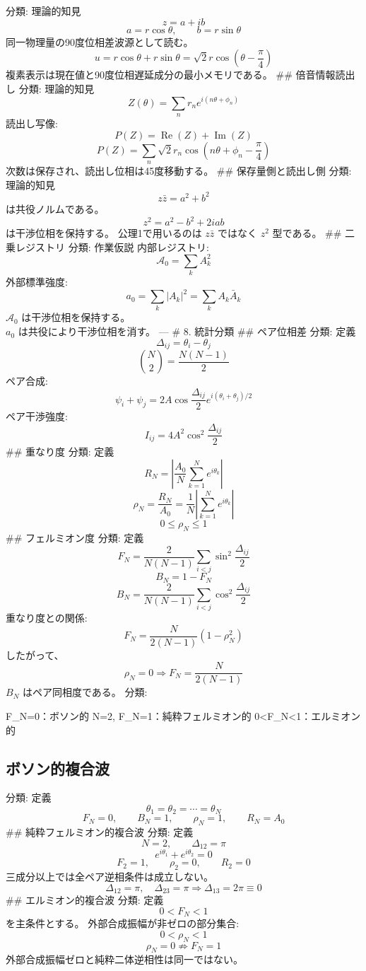 \documentclass[
  a4paper]{ltjsarticle}
\newenvironment{Shaded}{}{}
\newcommand{\NormalTok}[1]{#1}
\begin{document}
分類: 理論的知見 \[
z=a+ib
\] \[
a=r\cos\theta,\qquad b=r\sin\theta
\] 同一物理量の90度位相差波源として読む。 \[
u=r\cos\theta+r\sin\theta
=\sqrt2 r\cos\left(\theta-\frac{\pi}{4}\right)
\] 複素表示は現在値と90度位相遅延成分の最小メモリである。 \#\#
倍音情報読出し 分類: 理論的知見 \[
Z(\theta)=\sum_n r_n e^{i(n\theta+\phi_n)}
\] 読出し写像: \[
P(Z)=\operatorname{Re}(Z)+\operatorname{Im}(Z)
\] \[
P(Z)=\sum_n \sqrt2 r_n
\cos\left(n\theta+\phi_n-\frac{\pi}{4}\right)
\] 次数は保存され、読出し位相は45度移動する。 \#\# 保存量側と読出し側
分類: 理論的知見 \[
z\bar z=a^2+b^2
\] は共役ノルムである。 \[
z^2=a^2-b^2+2iab
\] は干渉位相を保持する。 公理1で用いるのは \(z\bar z\) ではなく \(z^2\)
型である。 \#\# 二乗レジストリ 分類: 作業仮説 内部レジストリ: \[
\mathcal{A}_0=\sum_k A_k^2
\] 外部標準強度: \[
a_0=\sum_k |A_k|^2=\sum_k A_k\bar A_k
\] \(\mathcal{A}_0\) は干渉位相を保持する。\\
\(a_0\) は共役により干渉位相を消す。 --- \# 8. 統計分類 \#\# ペア位相差
分類: 定義 \[
\Delta_{ij}=\theta_i-\theta_j
\] \[
\binom{N}{2}=\frac{N(N-1)}{2}
\] ペア合成: \[
\psi_i+\psi_j
=2A\cos\frac{\Delta_{ij}}{2}e^{i(\theta_i+\theta_j)/2}
\] ペア干渉強度: \[
I_{ij}=4A^2\cos^2\frac{\Delta_{ij}}{2}
\] \#\# 重なり度 分類: 定義 \[
R_N=\left|\frac{A_0}{N}\sum_{k=1}^{N}e^{i\theta_k}\right|
\] \[
\rho_N=\frac{R_N}{A_0}
=\frac{1}{N}\left|\sum_{k=1}^{N}e^{i\theta_k}\right|
\] \[
0\le\rho_N\le1
\] \#\# フェルミオン度 分類: 定義 \[
F_N=
\frac{2}{N(N-1)}
\sum_{i<j}\sin^2\frac{\Delta_{ij}}{2}
\] \[
B_N=1-F_N
\] \[
B_N=
\frac{2}{N(N-1)}
\sum_{i<j}\cos^2\frac{\Delta_{ij}}{2}
\] 重なり度との関係: \[
F_N=\frac{N}{2(N-1)}(1-\rho_N^2)
\] したがって、 \[
\rho_N=0\Rightarrow F_N=\frac{N}{2(N-1)}
\] \(B_N\) はペア同相度である。 分類:

\begin{Shaded}
\begin{Highlighting}[]
\NormalTok{F\_N=0：ボソン的}
\NormalTok{N=2, F\_N=1：純粋フェルミオン的}
\NormalTok{0\textless{}F\_N\textless{}1：エルミオン的}
\end{Highlighting}
\end{Shaded}

\subsection{ボソン的複合波}\label{ux30dcux30bdux30f3ux7684ux8907ux5408ux6ce2}

分類: 定義 \[
\theta_1=\theta_2=\cdots=\theta_N
\] \[
F_N=0,\qquad B_N=1,\qquad \rho_N=1,\qquad R_N=A_0
\] \#\# 純粋フェルミオン的複合波 分類: 定義 \[
N=2,\qquad \Delta_{12}=\pi
\] \[
e^{i\theta_1}+e^{i\theta_2}=0
\] \[
F_2=1,\qquad \rho_2=0,\qquad R_2=0
\] 三成分以上では全ペア逆相条件は成立しない。 \[
\Delta_{12}=\pi,\quad \Delta_{23}=\pi
\Rightarrow
\Delta_{13}=2\pi\equiv0
\] \#\# エルミオン的複合波 分類: 定義 \[
0<F_N<1
\] を主条件とする。 外部合成振幅が非ゼロの部分集合: \[
0<\rho_N<1
\] \[
\rho_N=0\not\Rightarrow F_N=1
\] 外部合成振幅ゼロと純粋二体逆相性は同一ではない。
\end{document}
